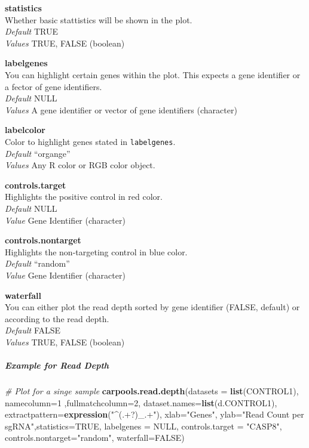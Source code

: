 \documentclass[]{article}
\newenvironment{Shaded}{\begin{snugshade}}{\end{snugshade}}
\newcommand{\KeywordTok}[1]{\textcolor[rgb]{0.13,0.29,0.53}{\textbf{{#1}}}}
\newcommand{\DataTypeTok}[1]{\textcolor[rgb]{0.13,0.29,0.53}{{#1}}}
\newcommand{\DecValTok}[1]{\textcolor[rgb]{0.00,0.00,0.81}{{#1}}}
\newcommand{\StringTok}[1]{\textcolor[rgb]{0.31,0.60,0.02}{{#1}}}
\newcommand{\CommentTok}[1]{\textcolor[rgb]{0.56,0.35,0.01}{\textit{{#1}}}}
\newcommand{\OtherTok}[1]{\textcolor[rgb]{0.56,0.35,0.01}{{#1}}}
\newcommand{\NormalTok}[1]{{#1}}
\let\oldsubparagraph\subparagraph
\renewcommand{\subparagraph}[1]{\oldsubparagraph{#1}\mbox{}}
\begin{document}
\textbf{statistics}\\
Whether basic stattistics will be shown in the plot.\\
\emph{Default} TRUE\\
\emph{Values} TRUE, FALSE (boolean)

\textbf{labelgenes}\\
You can highlight certain genes within the plot. This expects a gene
identifier or a fector of gene identifiers.\\
\emph{Default} NULL\\
\emph{Values} A gene identifier or vector of gene identifiers
(character)

\textbf{labelcolor}\\
Color to highlight genes stated in \texttt{labelgenes}.\\
\emph{Default} ``organge''\\
\emph{Values} Any R color or RGB color object.

\textbf{controls.target}\\
Highlights the positive control in red color.\\
\emph{Default} NULL\\
\emph{Value} Gene Identifier (character)

\textbf{controls.nontarget}\\
Highlights the non-targeting control in blue color.\\
\emph{Default} ``random''\\
\emph{Value} Gene Identifier (character)

\textbf{waterfall}\\
You can either plot the read depth sorted by gene identifier (FALSE,
default) or according to the read depth.\\
\emph{Default} FALSE\\
\emph{Values} TRUE, FALSE (boolean)

\subparagraph{Example for Read Depth}\label{example-for-read-depth}

\begin{Shaded}
\begin{Highlighting}[]
\CommentTok{# Plot for a singe sample}
\KeywordTok{carpools.read.depth}\NormalTok{(}\DataTypeTok{datasets =} \KeywordTok{list}\NormalTok{(CONTROL1), }\DataTypeTok{namecolumn=}\DecValTok{1} \NormalTok{,}\DataTypeTok{fullmatchcolumn=}\DecValTok{2}\NormalTok{,}
  \DataTypeTok{dataset.names=}\KeywordTok{list}\NormalTok{(d.CONTROL1), }\DataTypeTok{extractpattern=}\KeywordTok{expression}\NormalTok{(}\StringTok{"^(.+?)_.+"}\NormalTok{),}
  \DataTypeTok{xlab=}\StringTok{"Genes"}\NormalTok{, }\DataTypeTok{ylab=}\StringTok{"Read Count per sgRNA"}\NormalTok{,}\DataTypeTok{statistics=}\OtherTok{TRUE}\NormalTok{, }\DataTypeTok{labelgenes =} \OtherTok{NULL}\NormalTok{,}
  \DataTypeTok{controls.target =} \StringTok{"CASP8"}\NormalTok{, }\DataTypeTok{controls.nontarget=}\StringTok{"random"}\NormalTok{, }\DataTypeTok{waterfall=}\OtherTok{FALSE}\NormalTok{)}
\end{Highlighting}
\end{Shaded}
\end{document}
